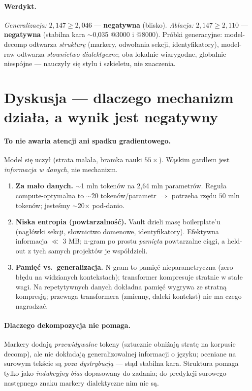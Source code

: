 \documentclass[11pt]{article}
\begin{document}
\paragraph{Werdykt.} \emph{Generalizacja:} $2{,}147 \geq 2{,}046$ --- \textbf{negatywna} (blisko). \emph{Ablacja:}
$2{,}147 \geq 2{,}110$ --- \textbf{negatywna} (stabilna kara $\sim$0{,}035 @3000 i @8000). Próbki generacyjne:
model-decomp odtwarza \emph{strukturę} (markery, odwołania sekcji, identyfikatory), model-raw odtwarza
\emph{słownictwo dialektyczne}; oba lokalnie wiarygodne, globalnie niespójne --- nauczyły się stylu i szkieletu,
nie znaczenia.

\section{Dyskusja --- dlaczego mechanizm działa, a wynik jest negatywny}
\paragraph{To nie awaria atencji ani spadku gradientowego.} Model się uczył (strata malała, bramka nauki $55\times$).
Wąskim gardłem jest \emph{informacja w danych}, nie mechanizm.
\begin{enumerate}
  \item \textbf{Za mało danych.} $\sim$1 mln tokenów na 2{,}64 mln parametrów. Reguła compute-optymalna to
  $\sim$20 tokenów/parametr \cite{chinchilla} $\Rightarrow$ potrzeba rzędu $50$ mln tokenów; jesteśmy
  $\sim$20$\times$ pod-danio.
  \item \textbf{Niska entropia (powtarzalność).} Vault dzieli masę boilerplate'u (nagłówki sekcji, słownictwo
  domenowe, identyfikatory). Efektywna informacja $\ll$ 3 MB; n-gram po prostu \emph{pamięta} powtarzalne ciągi, a
  held-out z tych samych projektów je współdzieli.
  \item \textbf{Pamięć vs.\ generalizacja.} N-gram to pamięć nieparametryczna (zero błędu na widzianych
  kontekstach); transformer kompresuje stratnie w stałe wagi. Na repetytywnych danych dokładna pamięć wygrywa ze
  stratną kompresją; przewaga transformera (zmienny, daleki kontekst) nie ma czego nagradzać.
\end{enumerate}

\paragraph{Dlaczego dekompozycja nie pomaga.} Markery dodają \emph{przewidywalne} tokeny (sztucznie obniżają stratę
na korpusie decomp), ale nie dokładają generalizowalnej informacji o języku; oceniane na surowym tekście są
\emph{poza dystrybucją} --- stąd stabilna kara. Struktura pomaga tylko jako \emph{indukcyjny bias} dopasowany do
zadania; do predykcji surowego następnego znaku markery dialektyczne nim nie są.
\end{document}
